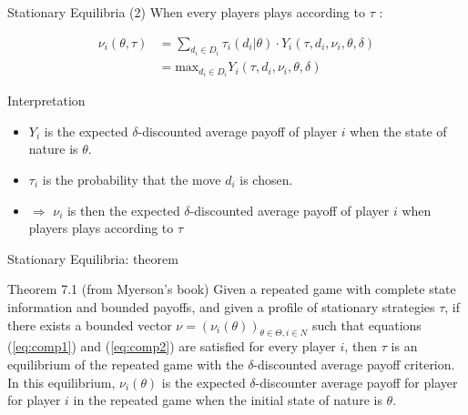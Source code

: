\begin{frame}{Stationary Equilibria (2)} 
    When every players plays according to $\tau$ :

    \begin{small}
        \begin{align}
            \nu_i(\theta, \tau) &= \sum_{d_i \in D_i} \tau_i(d_i|\theta) \cdot
            Y_i(\tau, d_i, \nu_i, \theta, \delta) \label{eq:comp1} \\
            &= \text{max}_{d_i \in D_i} Y_i(\tau, d_i, \nu_i, \theta, \delta)
            \label{eq:comp2}
        \end{align}
    \end{small}

    \begin{exampleblock}{Interpretation}
        \begin{itemize}
            \item $Y_i$ is the expected $\delta$-discounted average payoff of player $i$ when the
            state of nature is $\theta$.
            \item $\tau_i$ is the probability that the move $d_i$ is chosen.
            \item $\Rightarrow$ $\nu_i$ is then the expected $\delta$-discounted average payoff of
            player $i$ when players plays according to $\tau$
        \end{itemize}
    \end{exampleblock}
\end{frame}

\begin{frame}{Stationary Equilibria: theorem}
    \begin{block}{Theorem 7.1 (from Myerson's book)}
	    Given a repeated game with complete state information and bounded payoffs, and given a
        profile of stationary strategies $\tau$, if there exists a bounded vector
        $\nu = (\nu_i(\theta))_{\theta \in \Theta, i \in N}$ such that equations (\ref{eq:comp1})
        and (\ref{eq:comp2}) are satisfied for every player $i$, then $\tau$ is an equilibrium
        of the repeated game with the $\delta$-discounted average payoff criterion. In this
        equilibrium, $\nu_i(\theta)$ is the expected $\delta$-discounter average payoff for player
        for player $i$ in the repeated game when the initial state of nature is $\theta$.
    \end{block}
\end{frame}

